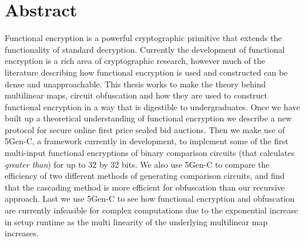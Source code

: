 \documentclass[12pt,twoside]{reedthesis}
\begin{document}
    \chapter*{Abstract}
	Functional encryption is a powerful cryptographic primitive that extends the functionality of standard decryption. Currently the development of functional encryption is a rich area of cryptographic research, however much of the literature describing how functional encryption is used and constructed can be dense and unapproachable. This thesis works to make the theory behind multilinear maps, circuit obfuscation and how they are used to construct functional encryption in a way that is digestible to undergraduates. Once we have built up a theoretical understanding of functional encryption we describe a new protocol for secure online first price sealed bid auctions. Then we make use of 5Gen-C, a framework currently in development, to implement some of the first multi-input functional encryptions of binary comparison circuits (that calculates \textit{greater than}) for up to 32 by 32 bits. We also use 5Gen-C to compare the efficiency of two different methods of generating comparison circuits, and find that the cascading method is more efficient for obfuscation than our recursive approach. Last we use 5Gen-C to see how functional encryption and obfuscation are currently infeasible for complex computations due to the exponential increase in setup runtime as the multi linearity of the underlying multilinear map increases.
	

    \tableofcontents
    
 
  \mainmatter %
  \pagestyle{fancyplain} %
    
\end{document}
